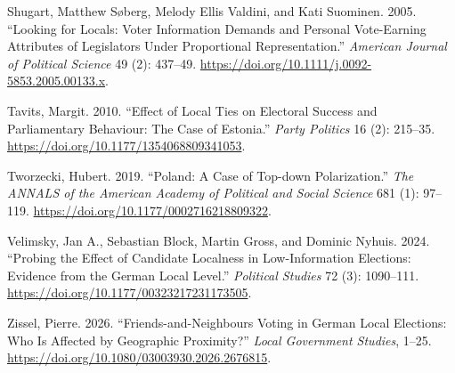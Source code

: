 \documentclass[
  letterpaper,
  DIV=11,
  numbers=noendperiod]{scrartcl}
\newlength{\cslhangindent}
\newenvironment{CSLReferences}[2] %
 {\begin{list}{}{%
  \setlength{\itemindent}{0pt}
  \setlength{\leftmargin}{0pt}
  \setlength{\parsep}{0pt}
  \ifodd #1
   \setlength{\leftmargin}{\cslhangindent}
   \setlength{\itemindent}{-1\cslhangindent}
  \fi
  \setlength{\itemsep}{#2\baselineskip}}}
 {\end{list}}
\begin{document}
\begin{CSLReferences}{1}{1}
Shugart, Matthew Søberg, Melody Ellis Valdini, and Kati Suominen. 2005.
{``Looking for Locals: Voter Information Demands and Personal
Vote-Earning Attributes of Legislators Under Proportional
Representation.''} \emph{American Journal of Political Science} 49 (2):
437--49. \url{https://doi.org/10.1111/j.0092-5853.2005.00133.x}.

Tavits, Margit. 2010. {``Effect of Local Ties on Electoral Success and
Parliamentary Behaviour: The Case of Estonia.''} \emph{Party Politics}
16 (2): 215--35. \url{https://doi.org/10.1177/1354068809341053}.

Tworzecki, Hubert. 2019. {``Poland: A Case of Top-down Polarization.''}
\emph{The ANNALS of the American Academy of Political and Social
Science} 681 (1): 97--119.
\url{https://doi.org/10.1177/0002716218809322}.

Velimsky, Jan A., Sebastian Block, Martin Gross, and Dominic Nyhuis.
2024. {``Probing the Effect of Candidate Localness in Low-Information
Elections: Evidence from the German Local Level.''} \emph{Political
Studies} 72 (3): 1090--111.
\url{https://doi.org/10.1177/00323217231173505}.

Zissel, Pierre. 2026. {``Friends-and-Neighbours Voting in German Local
Elections: Who Is Affected by Geographic Proximity?''} \emph{Local
Government Studies}, 1--25.
\url{https://doi.org/10.1080/03003930.2026.2676815}.

\end{CSLReferences}
\end{document}
